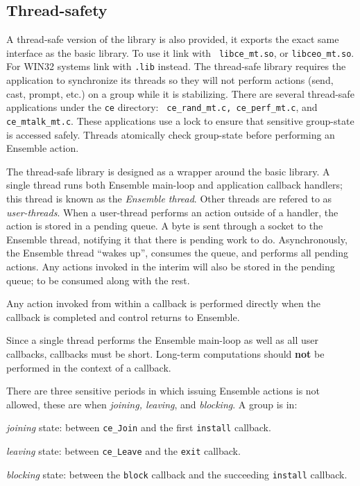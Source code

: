 \subsection{Thread-safety}
A thread-safe version of the library is also provided, it exports the
exact same interface as the basic library. To use it link with {\tt
libce\_mt.so}, or {\tt libceo\_mt.so}.  For WIN32 systems link with
{\tt .lib} instead. The thread-safe library requires the application
to synchronize its threads so they will not perform actions (send,
cast, prompt, etc.) on a group while it is stabilizing. There are
several thread-safe applications under the {\tt ce} directory: {\tt
ce\_rand\_mt.c, ce\_perf\_mt.c}, and {\tt ce\_mtalk\_mt.c}. These applications
use a lock to ensure that sensitive group-state is accessed safely.
Threads atomically check group-state before performing an Ensemble
action.

The thread-safe library is designed as a wrapper around the basic
library. A single thread runs both Ensemble main-loop and application
callback handlers; this thread is known as the {\it Ensemble
thread}. Other threads are refered to as {\it user-threads}. When a
user-thread performs an action outside of a handler, the action is
stored in a pending queue. A byte is sent through a socket to the
Ensemble thread, notifying it that there is pending work to do. 
Asynchronously, the Ensemble thread ``wakes up'', consumes the queue,
and performs all pending actions. Any actions invoked in the interim
will also be stored in the pending queue; to be consumed along with
the rest.

Any action invoked from within a callback is performed directly when
the callback is completed and control returns to Ensemble. 

Since a single thread performs the Ensemble main-loop as well as all user
callbacks, callbacks must be short. Long-term computations should {\bf
not} be performed in the context of a callback.

There are three sensitive periods in which issuing Ensemble actions is
not allowed, these are when {\it joining, leaving}, and {\it
blocking}. A group is in:
\begin{description}
\item {\it joining} state: between {\tt ce\_Join} and
the first {\tt install} callback.
\item {\it leaving} state: between {\tt ce\_Leave} and the {\tt exit}
callback.
\item {\it blocking} state: between the {\tt block} callback and the
succeeding {\tt install} callback.
\end{description}

